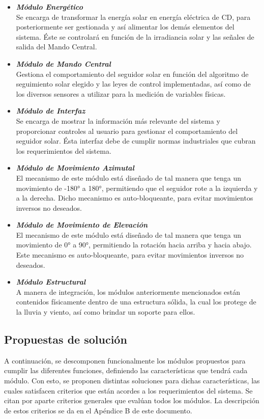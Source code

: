 \begin{itemize}
	\item \textit{\textbf{Módulo Energético}} \\
	Se encarga de transformar la energía solar en energía eléctrica de CD, para posteriormente ser gestionada y así alimentar los demás elementos del sistema. Éste se controlará en función de la irradiancia solar y las señales de salida del Mando Central.
	\item \textit{\textbf{Módulo de Mando Central}} \\
	Gestiona el comportamiento del seguidor solar en función del algoritmo de seguimiento solar elegido y las leyes de control implementadas, así como de los diversos sensores a utilizar para la medición de variables físicas.
	\item \textit{\textbf{Módulo de Interfaz}} \\
	Se encarga de mostrar la información más relevante del sistema y proporcionar controles al usuario para gestionar el comportamiento del seguidor solar. Ésta interfaz debe de cumplir normas industriales que cubran los requerimientos del sistema. 
	\item \textit{\textbf{Módulo de Movimiento Azimutal}} \\
	El mecanismo de este módulo está diseñado de tal manera que tenga un movimiento de -180° a 180°, permitiendo que el seguidor rote a la izquierda y a la derecha. Dicho mecanismo es auto-bloqueante, para evitar movimientos inversos no deseados.
	\item \textit{\textbf{Módulo de Movimiento de Elevación}} \\
	El mecanismo de este módulo está diseñado de tal manera que tenga un movimiento de 0° a 90°, permitiendo la rotación hacia arriba y hacia abajo. Este mecanismo es auto-bloqueante, para evitar movimientos inversos no deseados.
	\item \textit{\textbf{Módulo Estructural}} \\
	A manera de integración, los módulos anteriormente mencionados están contenidos físicamente dentro de una estructura sólida, la cual los protege de la lluvia y viento, así como brindar un soporte para ellos.
\end{itemize}

\newpage
\subsection{Propuestas de solución}
A continuación, se descomponen funcionalmente los módulos propuestos para cumplir las diferentes funciones, definiendo las características que tendrá cada módulo. Con esto, se proponen distintas soluciones para dichas características, las cuales satisfacen criterios que están acordes a los requerimientos del sistema. Se citan por aparte criterios generales que evalúan todos los módulos. La descripción de estos criterios se da en el Apéndice B de este documento.

